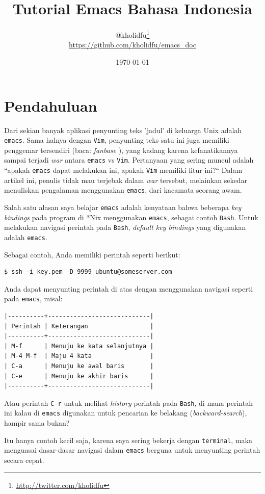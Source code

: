 \documentclass{article}
\title{Tutorial Emacs Bahasa Indonesia}
\author{
  @kholidfu\footnote{\url{http://twitter.com/kholidfu}}\\
  \footnotesize{\url{https://github.com/kholidfu/emacs\_doc}}
}
\date{\today}
\begin{document}
\maketitle
\tableofcontents
\pagebreak

\section{Pendahuluan}
Dari sekian banyak aplikasi penyunting teks 'jadul' di keluarga
Unix adalah \verb=emacs=. Sama halnya dengan \verb=Vim=, penyunting
teks satu ini juga memiliki penggemar tersendiri (baca: \emph{fanbase} \faSmileO), yang kadang
karena kefanatikannya sampai terjadi \emph{war} antara \verb=emacs=
vs \verb=Vim=. Pertanyaan yang sering muncul adalah ``apakah
\verb=emacs= dapat melakukan ini, apakah \verb=Vim= memiliki fitur
ini?`` Dalam artikel ini, penulis tidak mau terjebak dalam 
\emph{war} tersebut, melainkan sekedar menuliskan pengalaman 
menggunakan \verb=emacs=, dari kacamata seorang awam.

Salah satu alasan saya belajar \verb=emacs= adalah kenyataan
bahwa beberapa \emph{key bindings} pada program di *Nix 
menggunakan \verb=emacs=, sebagai contoh \verb=Bash=. Untuk
melakukan navigasi perintah pada \verb=Bash=, 
\emph{default key bindings} yang digunakan adalah \verb=emacs=.

Sebagai contoh, Anda memiliki perintah seperti berikut:

\begin{verbatim}
$ ssh -i key.pem -D 9999 ubuntu@someserver.com
\end{verbatim}

Anda dapat menyunting perintah di atas dengan menggunakan
navigasi seperti pada \verb=emacs=, misal:

\begin{verbatim}
|----------+----------------------------|
| Perintah | Keterangan                 |
|----------+----------------------------|
| M-f      | Menuju ke kata selanjutnya |
| M-4 M-f  | Maju 4 kata                |
| C-a      | Menuju ke awal baris       |
| C-e      | Menuju ke akhir baris      |
|----------+----------------------------|
\end{verbatim}

Atau perintah \verb=C-r= untuk melihat \emph{history} perintah
pada \verb=Bash=, di mana perintah ini kalau di \verb=emacs=
digunakan untuk pencarian ke belakang (\emph{backward-search}),
hampir sama bukan?

Itu hanya contoh kecil saja, karena saya sering bekerja dengan
\verb=terminal=, maka menguasai dasar-dasar navigasi dalam
\verb=emacs= berguna untuk menyunting perintah secara cepat.
\end{document}
